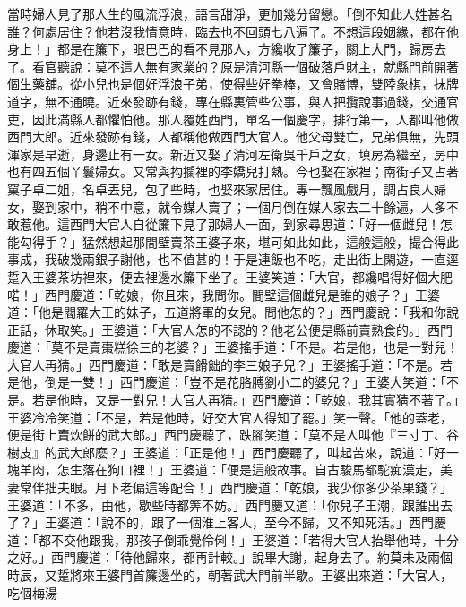 當時婦人見了那人生的風流浮浪，語言甜淨，更加幾分留戀。「倒不知此人姓甚名誰？何處居住？他若沒我情意時，臨去也不回頭七八遍了。不想這段姻緣，都在他身上！」都是在簾下，眼巴巴的看不見那人，方纔收了簾子，關上大門，歸房去了。看官聽說：莫不這人無有家業的？原是清河縣一個破落戶財主，就縣門前開著個生藥舖。從小兒也是個好浮浪子弟，使得些好拳棒，又會賭博，雙陸象棋，抹牌道字，無不通曉。近來發跡有錢，專在縣裏管些公事，與人把攬說事過錢，交通官吏，因此滿縣人都懼怕他。那人覆姓西門，單名一個慶字，排行第一，人都叫他做西門大郎。近來發跡有錢，人都稱他做西門大官人。他父母雙亡，兄弟俱無，先頭渾家是早逝，身邊止有一女。新近又娶了清河左衛吳千戶之女，填房為繼室，房中也有四五個丫鬟婦女。又常與抅攔裡的李嬌兒打熱。今也娶在家裡；南街子又占著窠子卓二姐，名卓丟兒，包了些時，也娶來家居住。專一飄風戲月，調占良人婦女，娶到家中，稍不中意，就令媒人賣了；一個月倒在媒人家去二十餘遍，人多不敢惹他。這西門大官人自從簾下見了那婦人一面，到家尋思道：「好一個雌兒！怎能勾得手？」猛然想起那間壁賣茶王婆子來，堪可如此如此，這般這般，撮合得此事成，我破幾兩銀子謝他，也不值甚的！于是連飯也不吃，走出街上閑遊，一直逕踅入王婆茶坊裡來，便去裡邊水簾下坐了。王婆笑道：「大官，都纔唱得好個大肥喏！」西門慶道：「乾娘，你且來，我問你。間壁這個雌兒是誰的娘子？」王婆道：「他是閻羅大王的妹子，五道將軍的女兒。問他怎的？」西門慶說：「我和你說正話，休取笑。」王婆道：「大官人怎的不認的？他老公便是縣前賣熟食的。」西門慶道：「莫不是賣棗糕徐三的老婆？」王婆搖手道：「不是。若是他，也是一對兒！大官人再猜。」西門慶道：「敢是賣餶飿的李三娘子兒？」王婆搖手道：「不是。若是他，倒是一雙！」西門慶道：「豈不是花胳膊劉小二的婆兒？」王婆大笑道：「不是。若是他時，又是一對兒！大官人再猜。」西門慶道：「乾娘，我其實猜不著了。」王婆冷冷笑道：「不是，若是他時，好交大官人得知了罷。」笑一聲。「他的蓋老，便是街上賣炊餅的武大郎。」西門慶聽了，跌腳笑道：「莫不是人叫他『三寸丁、谷樹皮』的武大郎麼？」王婆道：「正是他！」西門慶聽了，叫起苦來，說道：「好一塊羊肉，怎生落在狗口裡！」王婆道：「便是這般故事。自古駿馬都駝痴漢走，美妻常伴拙夫眼。月下老偏這等配合！」西門慶道：「乾娘，我少你多少茶果錢？」王婆道：「不多，由他，歇些時都筭不妨。」西門慶又道：「你兒子王潮，跟誰出去了？」王婆道：「說不的，跟了一個淮上客人，至今不歸，又不知死活。」西門慶道：「都不交他跟我，那孩子倒乖覺伶俐！」王婆道：「若得大官人抬舉他時，十分之好。」西門慶道：「待他歸來，都再計較。」說畢大謝，起身去了。約莫未及兩個時辰，又踅將來王婆門首簾邊坐的，朝著武大門前半歇。王婆出來道：「大官人，吃個梅湯 